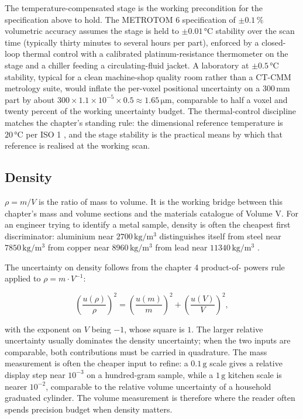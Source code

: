 The temperature-compensated stage is the working precondition for
the specification above to hold. The METROTOM 6 specification of
$\pm 0.1\,\%$ volumetric accuracy assumes the stage is held to
$\pm 0.01 \,\si{\degreeCelsius}$ stability over the scan time
(typically thirty minutes to several hours per part), enforced by
a closed-loop thermal control with a calibrated platinum-resistance
thermometer on the stage and a chiller feeding a circulating-fluid
jacket. A laboratory at $\pm 0.5 \,\si{\degreeCelsius}$ stability,
typical for a clean machine-shop quality room rather than a CT-CMM
metrology suite, would inflate the per-voxel positional uncertainty
on a $300 \,\si{\milli\meter}$ part by about
$300 \times 1.1 \times 10^{-5} \times 0.5 \approx 1.65 \,\si{\micro
\meter}$, comparable to half a voxel and twenty percent of the
working uncertainty budget. The thermal-control discipline matches
the chapter's standing rule: the dimensional reference temperature
is $20 \,\si{\degreeCelsius}$ per ISO 1 \cite{std:iso-1-2022}, and
the stage stability is the practical means by which that reference
is realised at the working scan.

\subsection{Density}

 $\rho = m / V$ is the ratio of mass to volume. It
is the working bridge between this chapter's mass and volume sections
and the materials catalogue of Volume V. For an engineer trying to
identify a metal sample, density is often the cheapest first
discriminator: aluminium near $2700 \,\si{\kilogram\per\meter\cubed}$
distinguishes itself from steel near $7850 \,\si{\kilogram\per\meter
\cubed}$ from copper near $8960 \,\si{\kilogram\per\meter\cubed}$ from
lead near $11340 \,\si{\kilogram\per\meter\cubed}$ \cite{text:ashby2017}.

The uncertainty on density follows from the chapter 4 product-of-
powers rule applied to $\rho = m \cdot V^{-1}$:

\[
\left(\frac{u(\rho)}{\rho}\right)^{2} = \left(\frac{u(m)}{m}\right)^{2}
+ \left(\frac{u(V)}{V}\right)^{2},
\]

with the exponent on $V$ being $-1$, whose square is $1$. The larger
relative uncertainty usually dominates the density uncertainty; when
the two inputs are comparable, both contributions must be carried
in quadrature. The mass measurement is often the cheaper input to
refine: a $0.1 \,\si{\gram}$ scale gives a relative display step
near $10^{-3}$ on a hundred-gram sample, while a $1 \,\si{\gram}$
kitchen scale is nearer $10^{-2}$, comparable to the relative
volume uncertainty of a household graduated cylinder. The volume
measurement is therefore where the reader often spends precision
budget when density matters.

